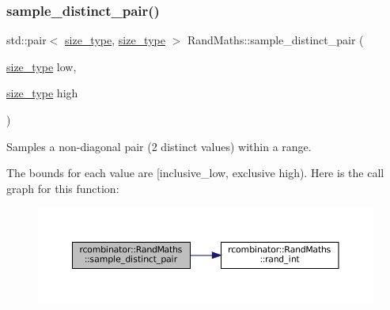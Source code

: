 \subsubsection{\texorpdfstring{sample\+\_\+distinct\+\_\+pair()}{sample\_distinct\_pair()}}
{\footnotesize\ttfamily std\+::pair$<$ \mbox{\hyperlink{constants_8h_abcd18a5521fc90ff6e7b00e4fee98397}{size\+\_\+type}}, \mbox{\hyperlink{constants_8h_abcd18a5521fc90ff6e7b00e4fee98397}{size\+\_\+type}} $>$ Rand\+Maths\+::sample\+\_\+distinct\+\_\+pair (\begin{DoxyParamCaption}\item[{\mbox{\hyperlink{constants_8h_abcd18a5521fc90ff6e7b00e4fee98397}{size\+\_\+type}}}]{low,  }\item[{\mbox{\hyperlink{constants_8h_abcd18a5521fc90ff6e7b00e4fee98397}{size\+\_\+type}}}]{high }\end{DoxyParamCaption})}



Samples a non-\/diagonal pair (2 distinct values) within a range. 

The bounds for each value are \mbox{[}inclusive\+\_\+low, exclusive high). Here is the call graph for this function\+:
\nopagebreak
\begin{figure}[H]
\begin{center}
\leavevmode
\includegraphics[width=350pt]{classrcombinator_1_1RandMaths_a2758ba7c9818bc664c4b751a697e1fe6_cgraph}
\end{center}
\end{figure}
\mbox{\label{classrcombinator_1_1RandMaths_a6a7fe159f46afec51d997e4d07d2cfe6}} 
